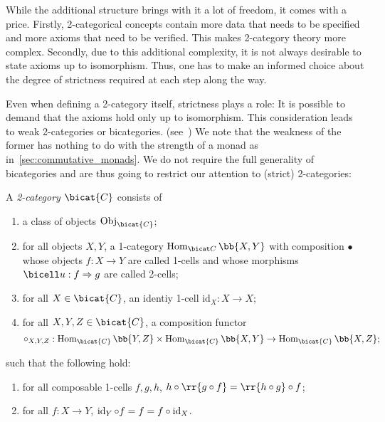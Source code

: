 While the additional structure brings with it a lot of freedom, it comes with a price.
Firstly, 2-categorical concepts contain more data that needs to be specified and
more axioms that need to be verified. This makes 2-category theory more complex.
Secondly, due to this additional complexity, it is not always desirable to state axioms up to
isomorphism. Thus, one has to make an informed choice about the degree of strictness
required at each step along the way.

Even when defining a 2-category itself, strictness plays a role: It is possible to
demand that the axioms hold only up to isomorphism. This consideration leads to weak
2-categories or bicategories. (see~\cite{leinster1998}) We note that the weakness of the former
has nothing to do with the strength of a monad as in~\ref{sec:commutative_monads}.
We do not require the full generality of bicategories and are thus going
to restrict our attention to (strict) 2-categories:

\begin{definition}\label{def:2category}
  A \emph{2-category} $\bicat{C}$ consists of \begin{enumerate}
    \item a class of objects $\Obj_{\bicat{C}}$;
    \item for all objects $X,Y$, a 1-category $\Hom_{\bicat C}\bb{X,Y}$ with
      composition $\bullet$ whose objects $f:X\to Y$ are called 1-cells and
      whose morphisms $\bicell u:f\Rightarrow g$ are called 2-cells;
    \item for all $X\in\bicat{C}$, an identiy 1-cell $\text{id}_X:X\to X$;
    \item for all $X,Y,Z\in\bicat{C}$, a composition functor
      \begin{equation}
        \label{eq:bicategory_composition}
        \circ_{X,Y,Z}:\Hom_{\bicat{C}}\bb{Y,Z}\times\Hom_{\bicat{C}}\bb{X,Y}
        \to\Hom_{\bicat{C}}\bb{X,Z};
      \end{equation}
  \end{enumerate}
  such that the following hold:
  \begin{enumerate}
    \item for all composable 1-cells $f,g,h$,
      $h\circ\rr{g\circ f}=\rr{h\circ g}\circ f$;
    \item for all $f:X\to Y$, $\operatorname{id}_Y\circ f = f = f\circ \operatorname{id}_X$.
  \end{enumerate}
\end{definition}

